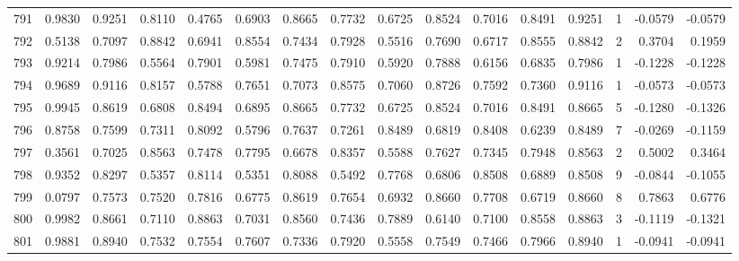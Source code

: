 \begin{tabular}{lrrrrrrrrrrrrrrr}
791 &      0.9830 &  0.9251 &  0.8110 &  0.4765 &  0.6903 &  0.8665 &  0.7732 &  0.6725 &  0.8524 &  0.7016 &   0.8491 &     0.9251 &      1 &                   -0.0579 &                    -0.0579 \\
792 &      0.5138 &  0.7097 &  0.8842 &  0.6941 &  0.8554 &  0.7434 &  0.7928 &  0.5516 &  0.7690 &  0.6717 &   0.8555 &     0.8842 &      2 &                    0.3704 &                     0.1959 \\
793 &      0.9214 &  0.7986 &  0.5564 &  0.7901 &  0.5981 &  0.7475 &  0.7910 &  0.5920 &  0.7888 &  0.6156 &   0.6835 &     0.7986 &      1 &                   -0.1228 &                    -0.1228 \\
794 &      0.9689 &  0.9116 &  0.8157 &  0.5788 &  0.7651 &  0.7073 &  0.8575 &  0.7060 &  0.8726 &  0.7592 &   0.7360 &     0.9116 &      1 &                   -0.0573 &                    -0.0573 \\
795 &      0.9945 &  0.8619 &  0.6808 &  0.8494 &  0.6895 &  0.8665 &  0.7732 &  0.6725 &  0.8524 &  0.7016 &   0.8491 &     0.8665 &      5 &                   -0.1280 &                    -0.1326 \\
796 &      0.8758 &  0.7599 &  0.7311 &  0.8092 &  0.5796 &  0.7637 &  0.7261 &  0.8489 &  0.6819 &  0.8408 &   0.6239 &     0.8489 &      7 &                   -0.0269 &                    -0.1159 \\
797 &      0.3561 &  0.7025 &  0.8563 &  0.7478 &  0.7795 &  0.6678 &  0.8357 &  0.5588 &  0.7627 &  0.7345 &   0.7948 &     0.8563 &      2 &                    0.5002 &                     0.3464 \\
798 &      0.9352 &  0.8297 &  0.5357 &  0.8114 &  0.5351 &  0.8088 &  0.5492 &  0.7768 &  0.6806 &  0.8508 &   0.6889 &     0.8508 &      9 &                   -0.0844 &                    -0.1055 \\
799 &      0.0797 &  0.7573 &  0.7520 &  0.7816 &  0.6775 &  0.8619 &  0.7654 &  0.6932 &  0.8660 &  0.7708 &   0.6719 &     0.8660 &      8 &                    0.7863 &                     0.6776 \\
800 &      0.9982 &  0.8661 &  0.7110 &  0.8863 &  0.7031 &  0.8560 &  0.7436 &  0.7889 &  0.6140 &  0.7100 &   0.8558 &     0.8863 &      3 &                   -0.1119 &                    -0.1321 \\
801 &      0.9881 &  0.8940 &  0.7532 &  0.7554 &  0.7607 &  0.7336 &  0.7920 &  0.5558 &  0.7549 &  0.7466 &   0.7966 &     0.8940 &      1 &                   -0.0941 &                    -0.0941 \\

\end{tabular}

